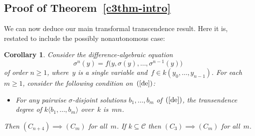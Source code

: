 \documentclass[\DocOpts]{amsart}
\newtheorem{corollary}[theorem]{Corollary}
\theoremstyle{definition}
\def\C{\mathcal{C}}
\newcommand{\<}{\langle}
\renewcommand{\>}{\rangle}
\begin{document}
\medskip
\subsection{Proof of Theorem~\ref{c3thm-intro}}
We can now deduce our main transformal transcendence result.
Here it is, restated to include the possibly nonautonomous case:

\begin{corollary}\label{c3thm}
Consider the difference-algebraic equation
\begin{equation}
\label{de}
\sigma^n(y)=f\big(y, \sigma(y),\dots,\sigma^{n-1}(y)\big)\tag{E}
\end{equation}
of order $n\geq 1$, where~$y$ is a single variable and~$f\in k(y_0,\dots,y_{n-1})$.
For each $m\geq 1$, consider the following condition on~$(\ref{de})$:
\begin{itemize}
\item[$(C_m)$]
For any pairwise $\sigma$-disjoint solutions $b_1,\dots,b_m$ of~$(\ref{de})$, the transendence degree of $k\langle b_1,\dots,b_m\rangle$ over~$k$ is~$mn$.
\end{itemize}
Then $(C_{n+4})\implies(C_m)$ for all~$m$.
If $k\subseteq\C$ then $(C_3)\implies(C_m)$ for all~$m$.
\end{corollary}
\end{document}
